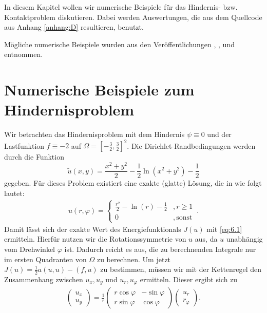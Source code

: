 \label{kap:6}


In diesem Kapitel wollen wir numerische Beispiele für das Hindernis- bzw. Kontaktproblem diskutieren. Dabei werden Auswertungen, die aus dem Quellcode aus Anhang \ref{anhang:D} resultieren, benutzt.

Mögliche numerische Beispiele wurden aus den Veröffentlichungen \cite{SiebVee}, \cite{BraeCar}, \cite{BraeCar2} und \cite{CarWri} entnommen.


\section{Numerische Beispiele zum Hindernisproblem}
\label{kap:6.1}

\begin{bsp}\label{bsp:6.1}
Wir betrachten das Hindernisproblem mit dem Hindernis $\psi \equiv 0$ und der Lastfunktion $f\equiv -2$ auf $\Omega = [-\frac 32,\frac 32]^2$. Die Dirichlet-Randbedingungen werden durch die Funktion
\[
	\tilde u(x,y) = \frac{x^2+y^2}2-\frac 12 \ln(x^2+y^2)-\frac 12
\]
gegeben. Für dieses Problem existiert eine exakte (glatte) Lösung, die in  wie folgt lautet:
\begin{align}\label{eq:6.1}
	u(r,\varphi) = \begin{cases}
					\frac{r^2}2-\ln (r)-\frac 12 & , r \ge 1 \\
					0 & , \, \text{sonst}
				\end{cases} \, .
\end{align}
Damit lässt sich der exakte Wert des Energiefunktionals $J(u)$ mit \eqref{eq:6.1} ermitteln. Hierfür nutzen wir die Rotationssymmetrie von $u$ aus, da $u$ unabhängig vom Drehwinkel $\varphi$ ist. Dadurch reicht es aus, die zu berechnenden Integrale nur im ersten Quadranten von $\Omega$ zu berechnen. Um jetzt $J(u)= \frac 12 a(u,u)-(f,u)$ zu bestimmen, müssen wir mit der Kettenregel den Zusammenhang zwischen $u_x,u_y$ und $u_r,u_\varphi$ ermitteln. Dieser ergibt sich zu
\begin{align}\label{eq:6.2}
	\begin{pmatrix} u_x \\ u_y \end{pmatrix} = \frac 1r \begin{pmatrix} r \cos \varphi & -\sin\varphi \\ r \sin\varphi & \cos\varphi \end{pmatrix} \begin{pmatrix} u_r \\ r_\varphi \end{pmatrix}.
\end{align}


\end{bsp}
